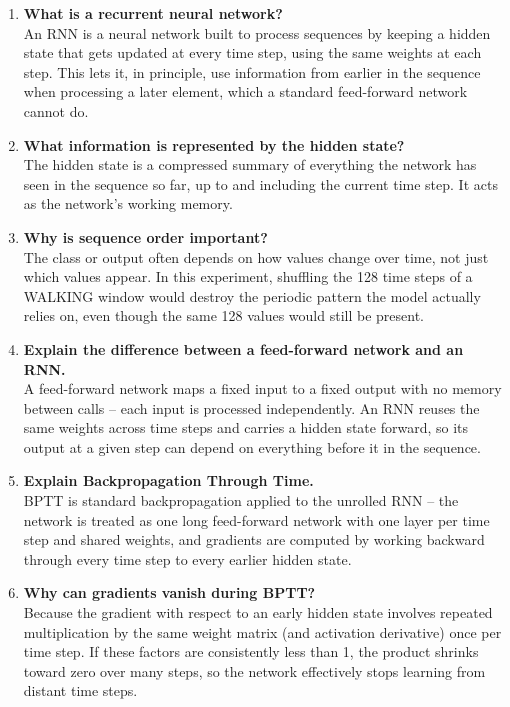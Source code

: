 \documentclass[10pt]{article}
\begin{document}
\begin{enumerate}

\item \textbf{What is a recurrent neural network?}\\
An RNN is a neural network built to process sequences by keeping a hidden
state that gets updated at every time step, using the same weights at each
step. This lets it, in principle, use information from earlier in the
sequence when processing a later element, which a standard feed-forward
network cannot do.

\item \textbf{What information is represented by the hidden state?}\\
The hidden state is a compressed summary of everything the network has seen
in the sequence so far, up to and including the current time step. It acts
as the network's working memory.

\item \textbf{Why is sequence order important?}\\
The class or output often depends on how values change over time, not just
which values appear. In this experiment, shuffling the 128 time steps of a
WALKING window would destroy the periodic pattern the model actually relies
on, even though the same 128 values would still be present.

\item \textbf{Explain the difference between a feed-forward network and an RNN.}\\
A feed-forward network maps a fixed input to a fixed output with no memory
between calls -- each input is processed independently. An RNN reuses the
same weights across time steps and carries a hidden state forward, so its
output at a given step can depend on everything before it in the sequence.

\item \textbf{Explain Backpropagation Through Time.}\\
BPTT is standard backpropagation applied to the unrolled RNN -- the network
is treated as one long feed-forward network with one layer per time step
and shared weights, and gradients are computed by working backward through
every time step to every earlier hidden state.

\item \textbf{Why can gradients vanish during BPTT?}\\
Because the gradient with respect to an early hidden state involves
repeated multiplication by the same weight matrix (and activation
derivative) once per time step. If these factors are consistently less than
1, the product shrinks toward zero over many steps, so the network
effectively stops learning from distant time steps.


\end{enumerate}
\end{document}

